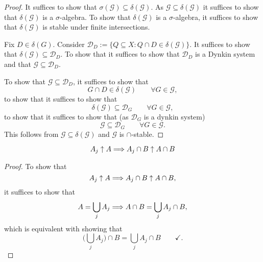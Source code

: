 \begin{proof}
It suffices to show that \(\sigma (\mathcal{G})\subseteq \delta (\mathcal{G})\). As \(\mathcal{G}\subseteq \delta (\mathcal{G})\) it suffices to show that \(\delta (\mathcal{G})\) is a \(\sigma \)-algebra. To show that \(\delta (\mathcal{G})\) is a \(\sigma \)-algebra, it suffices to show that \(\delta (\mathcal{G})\) is stable under finite intersections.

Fix \(D\in \delta (G)\). Consider \(\mathcal{D}_D:=\{Q\subseteq X : Q\cap D \in  \delta (\mathcal{G}) \}\). It suffices to show that \(\delta (\mathcal{G})\subseteq \mathcal{D}_D\). To show that it suffices to show that \(\mathcal{D}_D\) is a Dynkin system and that \(\mathcal{G}\subseteq \mathcal{D}_D\).

To show that \(\mathcal{G}\subseteq \mathcal{D}_D\), it suffices to show that
\[
G\cap D\in \delta (\mathcal{G}) \qquad \forall G\in \mathcal{G},
\]
to show that it suffices to show that
\[
\delta (\mathcal{G})\subseteq \mathcal{D}_G \qquad \forall G\in \mathcal{G},
\]
to show that it suffices to show that (as \(\mathcal{D}_G\) is a dynkin system)
\[
\mathcal{G}\subseteq \mathcal{D}_G \qquad \forall G\in \mathcal{G}.
\]
This follows from \(\mathcal{G}\subseteq \delta (\mathcal{G})\) and \(\mathcal{G}\) is $\cap $-stable.
\end{proof}

\begin{prop}
\[
A_{j}\uparrow A\space \Longrightarrow \space A_{j}\cap B\uparrow A\cap B
\]
\end{prop}

\begin{proof}
To show that
\[
A_{j}\uparrow A\space \Longrightarrow \space A_{j}\cap B\uparrow A\cap B,
\]
it suffices to show that
\[
A=\bigcup _{j}A_{j}\space \Longrightarrow \space A\cap B=\bigcup _{j}A_{j}\cap B,
\]
which is equivalent with showing that
\[
\bigg(\bigcup _{j}A_{j}\bigg)\cap B=\bigcup _{j}A_{j}\cap B \qquad \checkmark.
\]

\end{proof}

